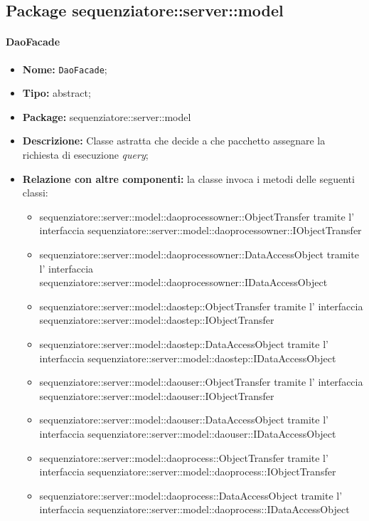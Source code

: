 \subsection{Package sequenziatore::server::model}
\paragraph{DaoFacade}
	\begin{itemize}
		\item \textbf{Nome:} \texttt{DaoFacade};
		\item \textbf{Tipo:} abstract;
		\item \textbf{Package:} sequenziatore::server::model
		\item \textbf{Descrizione:} Classe astratta che decide a che pacchetto assegnare la richiesta di esecuzione \textit{query};
		\item \textbf{Relazione con altre componenti:} la classe invoca i metodi delle seguenti classi:
		\begin{itemize}
			\item sequenziatore::server::model::daoprocessowner::ObjectTransfer tramite l' interfaccia sequenziatore::server::model::daoprocessowner::IObjectTransfer
			\item sequenziatore::server::model::daoprocessowner::DataAccessObject tramite l' interfaccia sequenziatore::server::model::daoprocessowner::IDataAccessObject
			\item sequenziatore::server::model::daostep::ObjectTransfer tramite l' interfaccia sequenziatore::server::model::daostep::IObjectTransfer
			\item sequenziatore::server::model::daostep::DataAccessObject tramite l' interfaccia sequenziatore::server::model::daostep::IDataAccessObject
			\item sequenziatore::server::model::daouser::ObjectTransfer tramite l' interfaccia sequenziatore::server::model::daouser::IObjectTransfer
			\item sequenziatore::server::model::daouser::DataAccessObject tramite l' interfaccia sequenziatore::server::model::daouser::IDataAccessObject
			\item sequenziatore::server::model::daoprocess::ObjectTransfer tramite l' interfaccia sequenziatore::server::model::daoprocess::IObjectTransfer
			\item sequenziatore::server::model::daoprocess::DataAccessObject tramite l' interfaccia sequenziatore::server::model::daoprocess::IDataAccessObject
		\end{itemize}
	\end{itemize}
